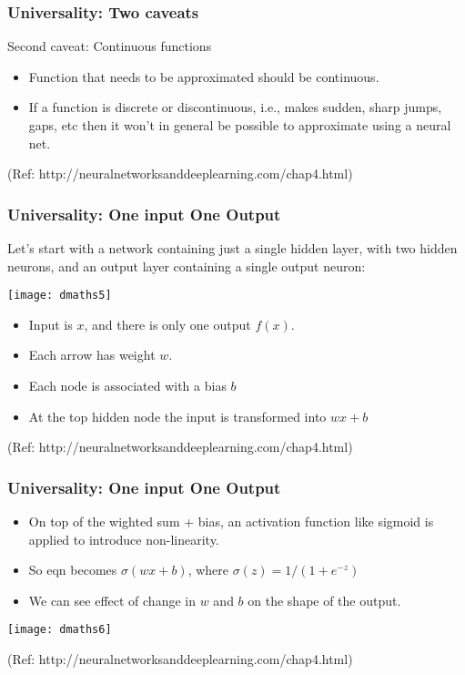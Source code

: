 \begin{frame}[fragile] \frametitle{Universality: Two caveats}
Second caveat: Continuous functions
\begin{itemize}
\item Function that needs to be approximated should be continuous.
\item If a function is discrete or discontinuous, i.e., makes sudden, sharp jumps, gaps, etc then it won't in general be possible to approximate using a neural net.
\end{itemize}

{\tiny (Ref: http://neuralnetworksanddeeplearning.com/chap4.html)}
\end{frame}

\begin{frame}[fragile] \frametitle{Universality: One input One Output}
Let's start with a network containing just a single hidden layer, with two hidden neurons, and an output layer containing a single output neuron:
\begin{center}
\texttt{[image: dmaths5]}
\end{center}

\begin{itemize}
\item Input is $x$, and there is only one output $f(x)$. 
\item Each arrow has weight $w$. 
\item Each node is associated with a bias $b$
\item At the top hidden node the input is transformed into $wx+b$
\end{itemize}

{\tiny (Ref: http://neuralnetworksanddeeplearning.com/chap4.html)}
\end{frame}

\begin{frame}[fragile] \frametitle{Universality: One input One Output}
\begin{itemize}
\item On top of the wighted sum + bias, an activation function like sigmoid is applied to introduce non-linearity. 
\item So eqn becomes $\sigma(wx+b)$, where $\sigma(z) = 1/(1+e^{-z})$
\item We can see effect of change in $w$ and $b$ on the shape of the output.
\end{itemize}

\begin{center}
\texttt{[image: dmaths6]}
\end{center}


{\tiny (Ref: http://neuralnetworksanddeeplearning.com/chap4.html)}
\end{frame}

